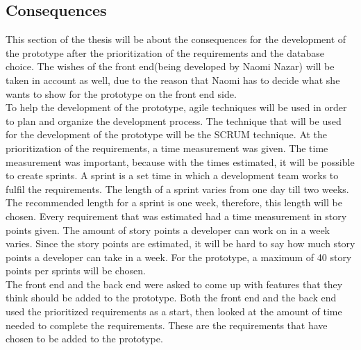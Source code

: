\documentclass[paper=a4, fontsize=11pt,twoside]{scrartcl}	%
\begin{document}
\subsection{Consequences}
This section of the thesis will be about the consequences for the development of the prototype after the prioritization of the requirements and the database choice. The wishes of the front end(being developed by Naomi Nazar) will be taken in account as well, due to the reason that Naomi has to decide what she wants to show for the prototype on the front end side. \\
To help the development of the prototype, agile techniques will be used in order to plan and organize the development process. The technique that will be used for the development of the prototype will be the SCRUM technique. At the prioritization of the requirements, a time measurement was given. The time measurement was important, because with the times estimated, it will be possible to create sprints. A sprint is a set time in which a development team works to fulfil the requirements. The length of a sprint varies from one day till two weeks. The recommended length for a sprint is one week, therefore, this length will be chosen. Every requirement that was estimated had a time measurement in story points given. The amount of story points a developer can work on in a week varies. Since the story points are estimated, it will be hard to say how much story points a developer can take in a week. For the prototype, a maximum of 40 story points per sprints will be chosen. \\
The front end and the back end were asked to come up with features that they think should be added to the prototype. Both the front end and the back end used the prioritized requirements as a start, then looked at the amount of time needed to complete the requirements. These are the requirements that have chosen to be added to the prototype. \\
\end{document}
